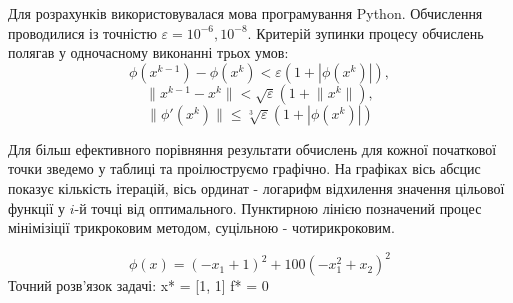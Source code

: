 Для розрахунків використовувалася мова програмування Python. Обчислення проводилися із точністю $\varepsilon = 10^{-6}, 10^{-8}$. Критерій зупинки процесу обчислень полягав у одночасному виконанні трьох умов:
$$
\phi(x^{k-1}) - \phi(x^{k}) < \varepsilon(1 + |\phi(x^{k})|), $$
$$\lVert x^{k-1} - x^{k} \rVert < \sqrt{\varepsilon}(1 + \lVert x^{k} \rVert), $$
$$ \lVert \phi'(x^{k})\rVert \leq \sqrt[3]{\varepsilon}(1 + |\phi(x^{k})|) 
$$

Для більш ефективного порівняння результати обчислень для кожної початкової точки зведемо у таблиці та проілюструємо графічно. На графіках вісь абсцис показує кількість ітерацій, вісь ординат - логарифм відхилення значення цільової функції у $i$-й точці від оптимального. Пунктирною лінією позначений процес мінімізіції трикроковим методом, суцільною - чотирикроковим.

\begin{example}
	$$\phi(x) = \left(- x_{1} + 1\right)^{2} + 100 \left(- x_{1}^{2} + x_{2}\right)^{2}$$
	Точний розв'язок задачі: x* = [1, 1] f* = 0
\end{example}

